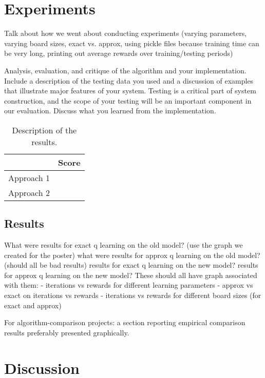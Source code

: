 \documentclass[11pt]{article}
\begin{document}
\section{Experiments}

Talk about how we went about conducting experiments (varying parameters, varying board sizes, exact vs. approx, using pickle files because training time can be very long, printing out average rewards over training/testing periods)

Analysis, evaluation, and critique of the algorithm and your
implementation. Include a description of the testing data you used and
a discussion of examples that illustrate major features of your
system. Testing is a critical part of system construction, and the
scope of your testing will be an important component in our
evaluation. Discuss what you learned from the implementation.

\begin{table}
  \centering
  \begin{tabular}{ll}
    \toprule
    & Score \\
    \midrule
    Approach 1 & \\
    Approach 2 & \\
    \bottomrule
  \end{tabular}
  \caption{Description of the results.}
\end{table}


\subsection{Results}

What were results for exact q learning on the old model? (use the graph we created for the poster)
what were results for approx q learning on the old model? (should all be bad results)
results for exact q learning on the new model?
results for approx q learning on the new model?
These should all have graph associated with them:
- iterations vs rewards for different learning parameters
- approx vs exact on iterations vs rewards
- iterations vs rewards for different board sizes (for exact and approx)

 For algorithm-comparison projects: a section reporting empirical comparison results preferably presented graphically.


\section{Discussion}
\end{document}
